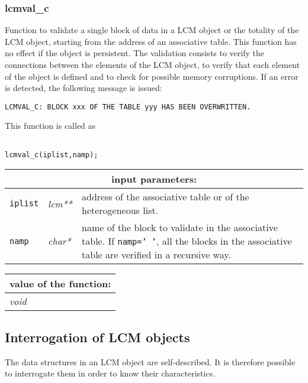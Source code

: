 \subsubsection{lcmval\_c}

Function to validate a single block of data in a LCM object or the totality of the LCM object,
starting from the address of an associative table. This function has no effect if the object is
persistent. The validation consists to verify the connections between the elements of the LCM
object, to verify that each element of the object is defined and to check for possible memory corruptions.
If an error is detected, the following message is issued:

\begin{verbatim}
LCMVAL_C: BLOCK xxx OF THE TABLE yyy HAS BEEN OVERWRITTEN.
\end{verbatim}

This function is called as

\begin{verbatim}

lcmval_c(iplist,namp);
\end{verbatim}

\noindent
\begin{tabular}{|p{1.5cm}|p{2cm}|p{11cm}|}
\hline
\multicolumn{3}{|c|}{\bf input parameters:} \\
\hline
{\tt iplist} & {\it lcm**} & address of the associative table or of the heterogeneous list. \\
\hline
{\tt namp} & {\it char*} & name of the block to validate in the associative table. 
If {\tt namp='~'}, all the blocks in the associative table are verified in a recursive way. \\
\hline
\end{tabular}

\vskip 0.8cm

\noindent
\begin{tabular}{|p{4.0cm}|p{11cm}|}
\hline
\multicolumn{2}{|c|}{\bf value of the function:} \\
\hline
{\it void} &  \\
\hline
\end{tabular}

\subsection{Interrogation of LCM objects}

The data structures in an LCM object are self-described. It is therefore possible to
interrogate them in order to know their characteristics.

